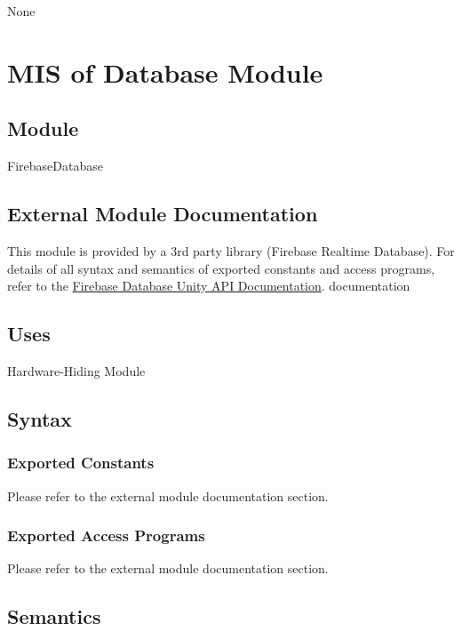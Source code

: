 \documentclass[12pt, titlepage]{article}
\begin{document}
None

\newpage

\section{MIS of Database Module} \label{mDB}

\subsection{Module}

FirebaseDatabase

\subsection{External Module Documentation}

This module is provided by a 3rd party library (Firebase Realtime Database). For details of all syntax and semantics of exported constants and access programs, refer to the \href{https://firebase.google.com/docs/reference/unity/namespace/firebase/database}{Firebase Database Unity API Documentation}.
documentation

\subsection{Uses}

Hardware-Hiding Module

\subsection{Syntax}

\subsubsection{Exported Constants}

Please refer to the external module documentation section.

\subsubsection{Exported Access Programs}

Please refer to the external module documentation section.

\subsection{Semantics}
\end{document}
